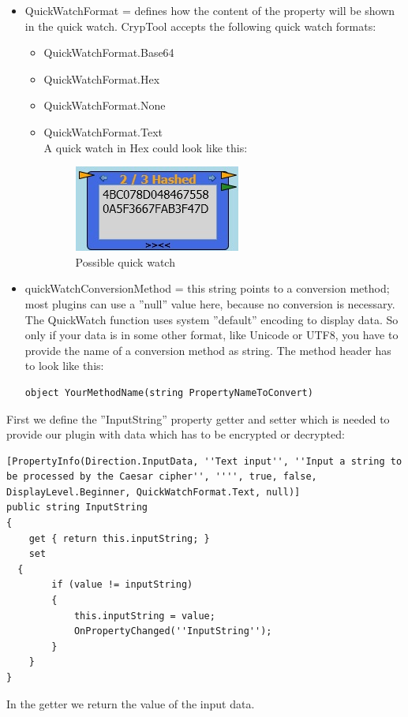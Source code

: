 \begin{itemize}
	\item QuickWatchFormat = defines how the content of the property will be shown in the quick watch. CrypTool accepts the following quick watch formats:
	\begin{itemize}
		\item QuickWatchFormat.Base64
		\item QuickWatchFormat.Hex
		\item QuickWatchFormat.None
		\item QuickWatchFormat.Text\\
		A quick watch in Hex could look like this:
\begin{figure}[h]
	\centering
		\includegraphics{figures/quick_watch.jpg}
	\caption{Possible quick watch}
	\label{fig:quick_watch}
\end{figure}
	\end{itemize}
	\item quickWatchConversionMethod = this string points to a conversion method; most plugins can use a ''null'' value here, because no conversion is necessary. The QuickWatch function uses system ''default'' encoding to display data. So only if your data is in some other format, like Unicode or UTF8, you have to provide the name of a conversion method as string. The method header has to look like this:
\begin{lstlisting}
object YourMethodName(string PropertyNameToConvert)
\end{lstlisting}
\end{itemize}
First we define the ''InputString'' property getter and setter which is needed to provide our plugin with data which has to be encrypted or decrypted:
\begin{lstlisting}
[PropertyInfo(Direction.InputData, ''Text input'', ''Input a string to be processed by the Caesar cipher'', '''', true, false, DisplayLevel.Beginner, QuickWatchFormat.Text, null)]
public string InputString
{
	get { return this.inputString; }
	set
  {
		if (value != inputString)
		{
			this.inputString = value;
			OnPropertyChanged(''InputString'');
		}
	}
}
\end{lstlisting}
In the getter we return the value of the input data.\\\\
